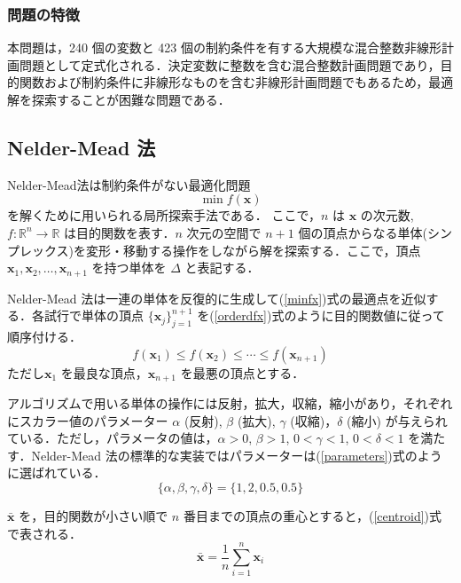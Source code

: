 \documentclass[twocolumn]{jarticle}
\begin{document}
    \subsubsection{問題の特徴}
    本問題は，240 個の変数と 423 個の制約条件を有する大規模な混合整数非線形計画問題として定式化される．決定変数に整数を含む混合整数計画問題であり，目的関数および制約条件に非線形なものを含む非線形計画問題でもあるため，最適解を探索することが困難な問題である．
    
    \subsection{Nelder-Mead 法}
    Nelder-Mead法\cite{10.1093/comjnl/7.4.308}は制約条件がない最適化問題
    \begin{equation}
        \label{minfx}
        \min f(\bm{x})
    \end{equation}
    を解くために用いられる局所探索手法である．%
    ここで，$n$ は $\bm{x}$ の次元数, $f: \mathbb{R}^n \rightarrow \mathbb{R}$ は目的関数を表す．$n$ 次元の空間で $n+1$ 個の頂点からなる単体(シンプレックス)を変形・移動する操作をしながら解を探索する．ここで，頂点 $\bm{x}_1, \bm{x}_2, \dots , \bm{x}_{n+1}$ を持つ単体を $\Delta$ と表記する． 
    
    Nelder-Mead 法は一連の単体を反復的に生成して(\ref{minfx})式の最適点を近似する．各試行で単体の頂点 $\{\bm{x}_j\}_{j=1}^{n+1}$ を(\ref{orderdfx})式のように目的関数値に従って順序付ける．
    \begin{equation}
        \label{orderdfx}
        f(\bm{x}_1) \leq f(\bm{x}_2) \leq \cdots \leq f(\bm{x}_{n+1})
    \end{equation}
    ただし$\bm{x}_1$ を最良な頂点，$\bm{x}_{n+1}$ を最悪の頂点とする．

    アルゴリズムで用いる単体の操作には反射，拡大，収縮，縮小があり，それぞれにスカラー値のパラメーター $\alpha$ (反射), $\beta$ (拡大), $\gamma$ (収縮)，$\delta$ (縮小) が与えられている．ただし，パラメータの値は，$\alpha > 0$, $\beta > 1$, $0 < \gamma < 1$, $0 < \delta < 1$ を満たす．Nelder-Mead 法の標準的な実装ではパラメーターは(\ref{parameters})式のように選ばれている．
    \begin{equation}
        \label{parameters}
        \{\alpha, \beta, \gamma, \delta\} = \{1, 2, 0.5, 0.5\}
    \end{equation}
    
    $\bar{\bm{x}}$ を，目的関数が小さい順で $n$ 番目までの頂点の重心とすると，(\ref{centroid})式で表される．
    \begin{equation}
        \label{centroid}
        \bar{\bm{x}} = \frac{1}{n}\sum_{i=1}^n\bm{x}_i
    \end{equation}
\end{document}
